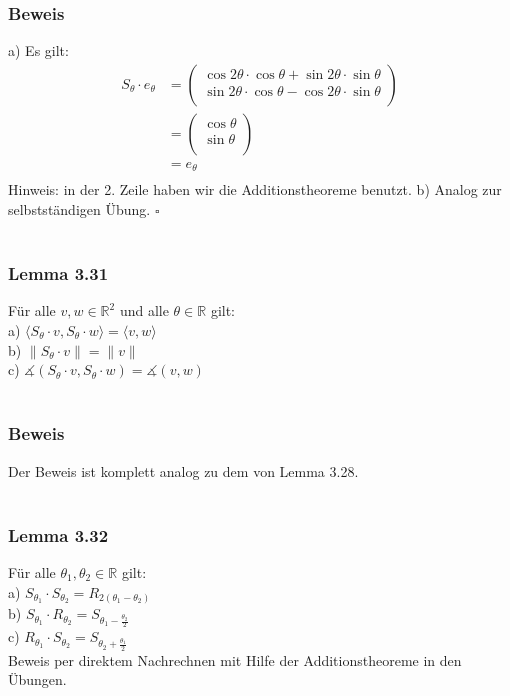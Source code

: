 \documentclass{article}
\begin{document}
\subsubsection*{Beweis}
a) Es gilt: \\
\begin{align*}
    S_\theta \cdot e_\theta &= \begin{pmatrix}
        \cos 2\theta \cdot \cos \theta + \sin 2\theta \cdot \sin \theta \\
        \sin 2\theta \cdot \cos \theta - \cos 2\theta \cdot \sin \theta \\ 
    \end{pmatrix} \\
    &= \begin{pmatrix}
        \cos \theta \\
        \sin \theta \\
    \end{pmatrix} \\
    &= e_\theta \\
\end{align*}
Hinweis: in der 2. Zeile haben wir die Additionstheoreme benutzt.
b) Analog zur selbstständigen Übung.
$\square$ \\
\\
\subsubsection*{Lemma 3.31}
Für alle $v,w \in \mathbb{R}^2$ und alle $\theta \in \mathbb{R}$ gilt: \\   
a) $\langle S_\theta \cdot v, S_\theta \cdot w \rangle = \langle v,w \rangle$ \\
b) $\|S_\theta \cdot v\| = \|v\|$ \\
c) $\measuredangle (S_\theta \cdot v, S_\theta \cdot w) = \measuredangle (v,w)$ \\
\\
\subsubsection*{Beweis}
Der Beweis ist komplett analog zu dem von Lemma 3.28. \\
\\
\subsubsection*{Lemma 3.32}
Für alle $\theta_1, \theta_2 \in \mathbb{R}$ gilt: \\
a) $S_{\theta_1} \cdot S_{\theta_2} = R_{2 (\theta_1 - \theta_2)}$ \\
b) $S_{\theta_1} \cdot R_{\theta_2} = S_{\theta_1 - \frac{\theta_2}{2}}$ \\
c) $R_{\theta_1} \cdot S_{\theta_2} = S_{\theta_2 + \frac{\theta_1}{2}}$ \\
Beweis per direktem Nachrechnen mit Hilfe der Additionstheoreme in den Übungen. \\
\end{document}
